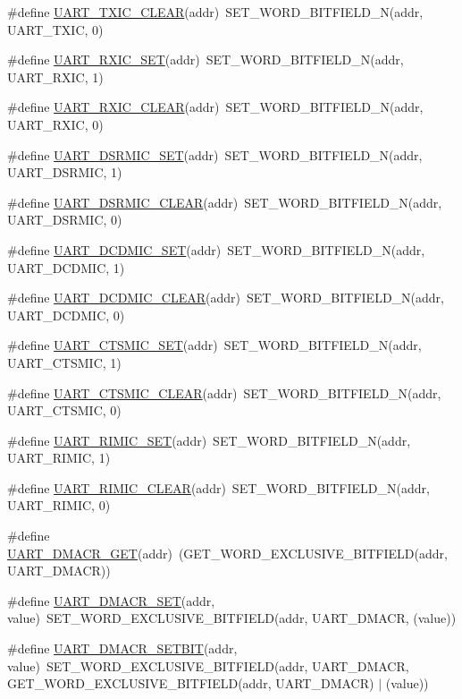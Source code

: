 \begin{DoxyCompactItemize}
\item 
\#define \hyperlink{a00574_ae181600bb9e658cbd4e59e16a8380ece}{UART\_\-TXIC\_\-CLEAR}(addr)~SET\_\-WORD\_\-BITFIELD\_\-N(addr, UART\_\-TXIC, 0)
\item 
\#define \hyperlink{a00574_a8ef21c239c0d4e06fd78cd165a5cf320}{UART\_\-RXIC\_\-SET}(addr)~SET\_\-WORD\_\-BITFIELD\_\-N(addr, UART\_\-RXIC, 1)
\item 
\#define \hyperlink{a00574_aec21d16f4be96392cfe45938ba917945}{UART\_\-RXIC\_\-CLEAR}(addr)~SET\_\-WORD\_\-BITFIELD\_\-N(addr, UART\_\-RXIC, 0)
\item 
\#define \hyperlink{a00574_ae72fae3e2843a70b7ad5ddfa46c6b8fd}{UART\_\-DSRMIC\_\-SET}(addr)~SET\_\-WORD\_\-BITFIELD\_\-N(addr, UART\_\-DSRMIC, 1)
\item 
\#define \hyperlink{a00574_a7e2a4a0588a7547d1b4b29fb7caf1c19}{UART\_\-DSRMIC\_\-CLEAR}(addr)~SET\_\-WORD\_\-BITFIELD\_\-N(addr, UART\_\-DSRMIC, 0)
\item 
\#define \hyperlink{a00574_a3f21957c589303570b2f1dd3f524b2c8}{UART\_\-DCDMIC\_\-SET}(addr)~SET\_\-WORD\_\-BITFIELD\_\-N(addr, UART\_\-DCDMIC, 1)
\item 
\#define \hyperlink{a00574_a0bf6758439bdd7dedb9614e61d8094b0}{UART\_\-DCDMIC\_\-CLEAR}(addr)~SET\_\-WORD\_\-BITFIELD\_\-N(addr, UART\_\-DCDMIC, 0)
\item 
\#define \hyperlink{a00574_ad6023d98be64e07a7b03994a5a774461}{UART\_\-CTSMIC\_\-SET}(addr)~SET\_\-WORD\_\-BITFIELD\_\-N(addr, UART\_\-CTSMIC, 1)
\item 
\#define \hyperlink{a00574_ac1df5c5374715b4cd72a89c69b28c8f5}{UART\_\-CTSMIC\_\-CLEAR}(addr)~SET\_\-WORD\_\-BITFIELD\_\-N(addr, UART\_\-CTSMIC, 0)
\item 
\#define \hyperlink{a00574_a21ef8919737be7cb35e3ea6ed8d68a2f}{UART\_\-RIMIC\_\-SET}(addr)~SET\_\-WORD\_\-BITFIELD\_\-N(addr, UART\_\-RIMIC, 1)
\item 
\#define \hyperlink{a00574_af33fb1c594367695ad7a02bfd6863691}{UART\_\-RIMIC\_\-CLEAR}(addr)~SET\_\-WORD\_\-BITFIELD\_\-N(addr, UART\_\-RIMIC, 0)
\item 
\#define \hyperlink{a00574_a7b298ebbaeb1a5f069dcd8079d1902ac}{UART\_\-DMACR\_\-GET}(addr)~(GET\_\-WORD\_\-EXCLUSIVE\_\-BITFIELD(addr, UART\_\-DMACR))
\item 
\#define \hyperlink{a00574_a8488b0a51afd7bfdc0022b64ba38e26e}{UART\_\-DMACR\_\-SET}(addr, value)~SET\_\-WORD\_\-EXCLUSIVE\_\-BITFIELD(addr, UART\_\-DMACR, (value))
\item 
\#define \hyperlink{a00574_a926d96c8cda5524ada676ffabf7a4258}{UART\_\-DMACR\_\-SETBIT}(addr, value)~SET\_\-WORD\_\-EXCLUSIVE\_\-BITFIELD(addr, UART\_\-DMACR, GET\_\-WORD\_\-EXCLUSIVE\_\-BITFIELD(addr, UART\_\-DMACR) $|$ (value))

\end{DoxyCompactItemize}
